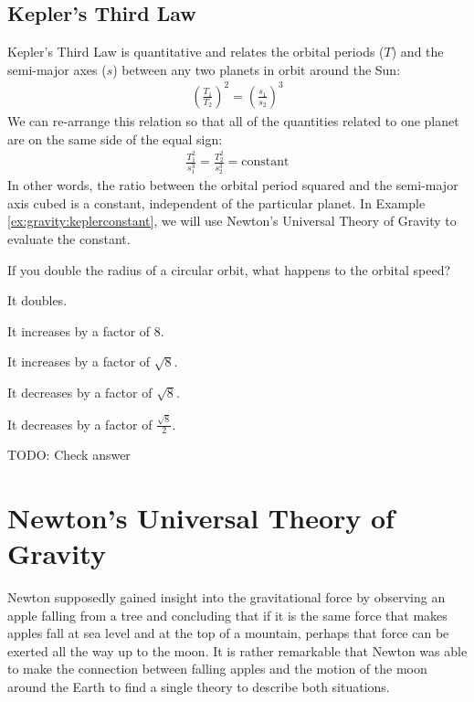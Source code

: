 \subsection{Kepler's Third Law}
Kepler's Third Law is quantitative and relates the orbital periods ($T$) and the semi-major axes ($s$) between any two planets in orbit around the Sun:
\begin{align*}
\left(\frac{T_1}{T_2}\right)^2=\left(\frac{s_1}{s_2}\right)^3
\end{align*}
We can re-arrange this relation so that all of the quantities related to one planet are on the same side of the equal sign:
\begin{align*}
\frac{T_1^2}{s_1^3}=\frac{T_2^2}{s_2^3}=\text{constant}
\end{align*}
In other words, the ratio between the orbital period squared and the semi-major axis cubed is a constant, independent of the particular planet. In Example \ref{ex:gravity:keplerconstant}, we will use Newton's Universal Theory of Gravity to evaluate the constant.

\begin{checkpoint}
\begin{MCquestion}{If you double the radius of a circular orbit, what happens to the orbital speed?}
\item It doubles.
\item It increases by a factor of 8.
\item It increases by a factor of $\sqrt{8}$.
\item It decreases by a factor of $\sqrt{8}$.
\item It decreases by a factor of $\frac{\sqrt{8}}{2}$. \correct
\end{MCquestion}
\end{checkpoint}
TODO: Check answer

\section{Newton's Universal Theory of Gravity}
Newton supposedly gained insight into the gravitational force by observing an apple falling from a tree and concluding that if it is the same force that makes apples fall at sea level and at the top of a mountain, perhaps that force can be exerted all the way up to the moon. It is rather remarkable that Newton was able to make the connection between falling apples and the motion of the moon around the Earth to find a single theory to describe both situations.

